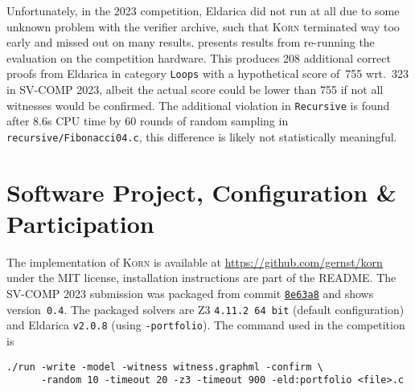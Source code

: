 \documentclass{llncs}
\newcommand{\Korn}{\textsc{Korn}\xspace}
\begin{document}
Unfortunately, in the 2023 competition,
Eldarica did not run at all due to some unknown problem with the verifier archive,
such that \Korn terminated way too early and missed out on many results.
 presents results from re-running the evaluation on the competition hardware.
This produces 208 additional correct proofs from Eldarica
in category \texttt{Loops} with a hypothetical score of~755
wrt.~323 in SV-COMP 2023, albeit the actual score could be lower than 755 if not all witnesses would be confirmed.
The additional violation in \texttt{Recursive} is found after 8.6s CPU time
by 60 rounds of random sampling in \texttt{recursive/Fibonacci04.c},
this difference is likely not statistically meaningful.


\section{Software Project, Configuration \& Participation}
\label{sec:project}

The implementation of \Korn is available at
    \url{https://github.com/gernst/korn} under the MIT license,
installation instructions are part of the README.
The SV-COMP 2023 submission was packaged from commit
\href{https://github.com/gernst/korn/commit/8e968dd9e1498d358270d1e78d473befca8e63a8}{\tt 8e63a8}
and shows version~\texttt{0.4}.
The packaged solvers are Z3 \texttt{4.11.2 64 bit} (default configuration) and Eldarica \texttt{v2.0.8} (using \texttt{-portfolio}).
The command used in the competition is
\begin{verbatim}
./run -write -model -witness witness.graphml -confirm \
      -random 10 -timeout 20 -z3 -timeout 900 -eld:portfolio <file>.c
\end{verbatim}
\end{document}
